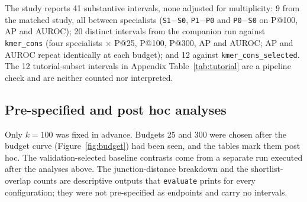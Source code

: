 \documentclass[11pt]{article}
\makeatletter
\newcommand{\cfg}[1]{\texttt{#1}}
\newcommand{\pk}[1]{P@#1}
\makeatother
\begin{document}
The study reports 41 substantive intervals, none adjusted for multiplicity: 9 from the matched study, all between
specialists (\cfg{S1}$-$\cfg{S0}, \cfg{P1}$-$\cfg{P0} and \cfg{P0}$-$\cfg{S0} on \pk{100}, AP and AUROC); 20
distinct intervals from the companion run against \cfg{kmer\_cons} (four specialists $\times$ \pk{25}, \pk{100},
\pk{300}, AP and AUROC; AP and AUROC repeat identically at each budget); and 12 against
\cfg{kmer\_cons\_selected}. The 12 tutorial-subset intervals in Appendix Table~\ref{tab:tutorial} are a pipeline check
and are neither counted nor interpreted.

\subsection{Pre-specified and post hoc analyses}\label{sec:posthoc}
Only $k=100$ was fixed in advance. Budgets 25 and 300 were chosen after the budget curve
(Figure~\ref{fig:budget}) had been seen, and the tables mark them post hoc. The validation-selected baseline contrasts
come from a separate run executed after the analyses above. The junction-distance breakdown and the shortlist-overlap
counts are descriptive outputs that \texttt{evaluate} prints for every configuration; they were not pre-specified as
endpoints and carry no intervals.
\end{document}
